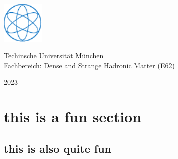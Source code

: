 \documentclass[12pt,twoside]{article}
\begin{document}
{  
  \vspace*{\fill}
  
  
  
  \includegraphics[width=0.15\textwidth]{Figures/PH_CMYK-eps-converted-to.pdf}
  \\[0.3\baselineskip] %
  
  \null
  \vfill
  
  \vspace{1em}
  \large Techinsche Universit\"at M\"unchen\\
   \vspace{0.5em}
  \large Fachbereich: Dense and Strange Hadronic Matter (E62)\\
  \vspace{0.5em}
  
  {\scshape 2023} \\[0.3\baselineskip] %
  
}

\newpage\null\thispagestyle{empty}\newpage



\newpage\null\thispagestyle{empty}\newpage

%

\newpage\null\thispagestyle{empty}\newpage


\restoregeometry
{}
\setcounter{page}{1}
\tableofcontents
\newpage
{}
\pagestyle{headings}
\section{this is a fun section}
\subsection{this is also quite fun}

%
%
%
%
%
%
%
%
%
%
%
\end{document}
